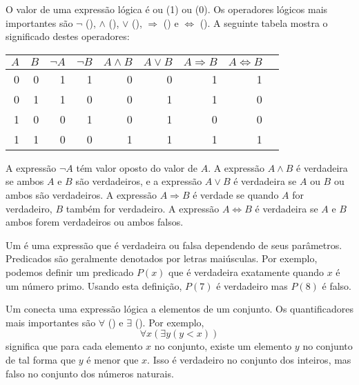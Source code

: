 
O valor de uma expressão lógica é ou
 (1) ou  (0).
Os operadores lógicos mais importantes são
$\lnot$ (),
$\land$ (),
$\lor$ (),
$\Rightarrow$ () e
$\Leftrightarrow$ ().
A seguinte tabela mostra o significado destes operadores:

\begin{center}
\begin{tabular}{rr|rrrrrrr}
$A$ & $B$ & $\lnot A$ & $\lnot B$ & $A \land B$ & $A \lor B$ & $A \Rightarrow B$ & $A \Leftrightarrow B$ \\
\hline
0 & 0 & 1 & 1 & 0 & 0 & 1 & 1 \\
0 & 1 & 1 & 0 & 0 & 1 & 1 & 0 \\
1 & 0 & 0 & 1 & 0 & 1 & 0 & 0 \\
1 & 1 & 0 & 0 & 1 & 1 & 1 & 1 \\
\end{tabular}
\end{center}

A expressão $\lnot A$ tém valor oposto do valor de $A$.
A expressão $A \land B$ é verdadeira se ambos $A$ e $B$
são verdadeiros,
e a expressão $A \lor B$ é verdadeira se $A$ ou $B$ ou ambos
são verdadeiros.
A expressão $A \Rightarrow B$ é verdade se quando $A$ for verdadeiro,
$B$ também for verdadeiro.
A expressão $A \Leftrightarrow B$ é verdadeira se $A$ e $B$ ambos forem verdadeiros ou ambos falsos.


Um  é uma expressão que é verdadeira ou falsa
dependendo de seus parâmetros.
Predicados são geralmente denotados por letras maiúsculas.
Por exemplo, podemos definir um predicado $P(x)$
que é verdadeira exatamente quando $x$ é um número primo.
Usando esta definição, $P(7)$ é verdadeiro mas $P(8)$ é falso.


Um  conecta uma expressão lógica
a elementos de um conjunto.
Os quantificadores mais importantes são
$\forall$ () e $\exists$ ().
Por exemplo,
\[\forall x (\exists y (y < x))\]
significa que para cada elemento $x$ no conjunto,
existe um elemento $y$ no conjunto
de tal forma que $y$ é menor que $x$.
Isso é verdadeiro no conjunto dos inteiros,
mas falso no conjunto dos números naturais.

